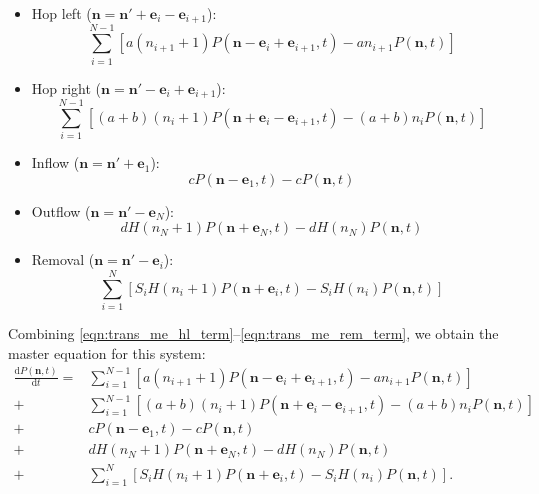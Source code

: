\documentclass[a4paper,11pt]{report}
\numberwithin{equation}{section}
\newcommand{\diff}[2]{\frac{\mathrm{d} #1}{\mathrm{d} #2}}
\newcommand{\V}[1]{\mathbf{#1}}
\begin{document}
\begin{itemize}
    \item Hop left (\(\V{n} = \V{n}' + \V{e}_i - \V{e}_{i+1}\)):
        \begin{equation}
            \label{eqn:trans_me_hl_term}
            \sum_{i=1}^{N-1} \left[a(n_{i+1}+1) P(\V{n} - \V{e}_i +
                \V{e}_{i+1},t) - a n_{i+1} P(\V{n},t) \right]
        \end{equation}
    \item Hop right (\(\V{n} = \V{n}' - \V{e}_i + \V{e}_{i+1}\)):
        \begin{equation}
            \label{eqn:trans_me_hr_term}
            \sum_{i=1}^{N-1} \left[(a+b)(n_i+1) P(\V{n} + \V{e}_i -
                \V{e}_{i+1},t) - (a+b)n_i P(\V{n},t) \right]
        \end{equation}
    \item Inflow (\(\V{n} = \V{n}' + \V{e}_1\)):
        \begin{equation}
            \label{eqn:trans_me_in_term}
            cP(\V{n} - \V{e}_1,t) - c P(\V{n},t)
        \end{equation}
    \item Outflow (\(\V{n} = \V{n}' - \V{e}_N\)):
        \begin{equation}
            \label{eqn:trans_me_out_term}
            d H(n_N + 1) P(\V{n} + \V{e}_N,t) - d H(n_N) P(\V{n},t)
        \end{equation}
    \item Removal (\(\V{n} = \V{n}' - \V{e}_i\)):
        \begin{equation}
            \label{eqn:trans_me_rem_term}
            \sum_{i=1}^N \left[ S_i H(n_i + 1) P(\V{n} + \V{e}_i,t) - S_i H(n_i) P(\V{n},t)
                \right]
        \end{equation}
\end{itemize}

Combining \eqref{eqn:trans_me_hl_term}--\eqref{eqn:trans_me_rem_term}, we
obtain the master equation for this system:
\begin{equation}
    \label{eqn:trans_me}
    \begin{split}
        \diff{P(\V{n},t)}{t} = &
            \sum_{i=1}^{N-1} \left[a(n_{i+1}+1) P(\V{n} - \V{e}_i +
                \V{e}_{i+1},t) - a n_{i+1} P(\V{n},t) \right]\\
            +&\sum_{i=1}^{N-1} \left[(a+b)(n_i+1) P(\V{n} + \V{e}_i -
                \V{e}_{i+1},t) - (a+b)n_i P(\V{n},t) \right]\\
            +&cP(\V{n} - \V{e}_1,t) - c P(\V{n},t)\\
            +&d H(n_N + 1) P(\V{n} + \V{e}_N,t) - d H(n_N) P(\V{n},t)\\
            +&\sum_{i=1}^N \left[ S_i H(n_i + 1) P(\V{n} + \V{e}_i,t) - S_i
                H(n_i) P(\V{n},t)
                \right].
    \end{split}
\end{equation}
\end{document}
